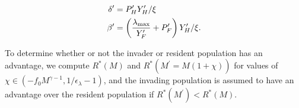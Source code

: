 \documentclass[twocolumn,preprintnumbers,amsmath,amssymb,superscriptaddress]{revtex4}
\begin{document}
\begin{align}
  \delta^\prime &= P^\prime_{H}Y^\prime_{H}/\xi \\ \nonumber
  \beta^\prime &= \left(\frac{\lambda_{\rm max}}{Y^\prime_{F}}+P^\prime_{F} \right)Y^\prime_{H}/\xi.
\end{align}

To determine whether or not the invader or resident population has an advantage, we compute $R^*(M)$ and $R^*(M^\prime=M(1+\chi))$ for values of $\chi \in (-f_0M^{\gamma-1},1/\epsilon_{\lambda}-1)$, and the invading population is assumed to have an advantage over the resident population if $R^*(M^\prime)<R^*(M)$.




\end{document}
